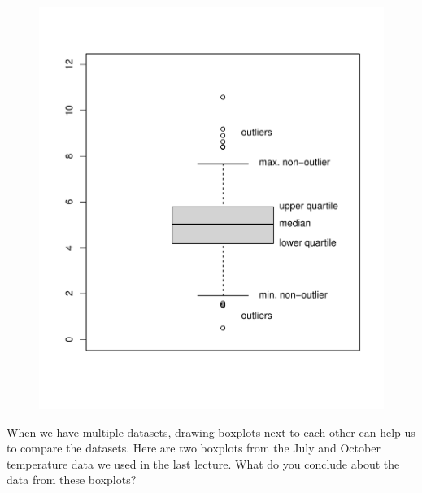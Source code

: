 \documentclass[
  letterpaper,
  DIV=11,
  numbers=noendperiod]{scrreprt}
\newenvironment{Shaded}{\begin{snugshade}}{\end{snugshade}}
\newcommand{\AttributeTok}[1]{\textcolor[rgb]{0.40,0.45,0.13}{#1}}
\newcommand{\FunctionTok}[1]{\textcolor[rgb]{0.28,0.35,0.67}{#1}}
\newcommand{\NormalTok}[1]{\textcolor[rgb]{0.00,0.23,0.31}{#1}}
\newcommand{\OtherTok}[1]{\textcolor[rgb]{0.00,0.23,0.31}{#1}}
\newcommand{\SpecialCharTok}[1]{\textcolor[rgb]{0.37,0.37,0.37}{#1}}
\newcommand{\StringTok}[1]{\textcolor[rgb]{0.13,0.47,0.30}{#1}}
\theoremstyle{remark}
\begin{document}
\begin{figure}

{\centering \includegraphics{sections/L02-dataviz_files/figure-pdf/boxplot1-1.pdf}

}

\end{figure}

When we have multiple datasets, drawing boxplots next to each other can
help us to compare the datasets. Here are two boxplots from the July and
October temperature data we used in the last lecture. What do you
conclude about the data from these boxplots?

\begin{Shaded}
\end{Shaded}
\end{document}

